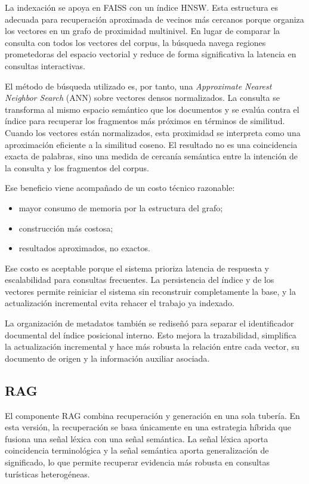 \documentclass{llncs}
\begin{document}
La indexación se apoya en FAISS con un índice HNSW. Esta estructura es adecuada para recuperación aproximada de vecinos más cercanos porque organiza los vectores en un grafo de proximidad multinivel. En lugar de comparar la consulta con todos los vectores del corpus, la búsqueda navega regiones prometedoras del espacio vectorial y reduce de forma significativa la latencia en consultas interactivas.

El método de búsqueda utilizado es, por tanto, una \textit{Approximate Nearest Neighbor Search} (ANN) sobre vectores densos normalizados. La consulta se transforma al mismo espacio semántico que los documentos y se evalúa contra el índice para recuperar los fragmentos más próximos en términos de similitud. Cuando los vectores están normalizados, esta proximidad se interpreta como una aproximación eficiente a la similitud coseno. El resultado no es una coincidencia exacta de palabras, sino una medida de cercanía semántica entre la intención de la consulta y los fragmentos del corpus.

Ese beneficio viene acompañado de un costo técnico razonable:

\begin{itemize}
    \item mayor consumo de memoria por la estructura del grafo;
    \item construcción más costosa;
    \item resultados aproximados, no exactos.
\end{itemize}

Ese costo es aceptable porque el sistema prioriza latencia de respuesta y escalabilidad para consultas frecuentes. La persistencia del índice y de los vectores permite reiniciar el sistema sin reconstruir completamente la base, y la actualización incremental evita rehacer el trabajo ya indexado.

La organización de metadatos también se rediseñó para separar el identificador documental del índice posicional interno. Esto mejora la trazabilidad, simplifica la actualización incremental y hace más robusta la relación entre cada vector, su documento de origen y la información auxiliar asociada.

\subsection{RAG}

El componente RAG combina recuperación y generación en una sola tubería. En esta versión, la recuperación se basa únicamente en una estrategia híbrida que fusiona una señal léxica con una señal semántica. La señal léxica aporta coincidencia terminológica y la señal semántica aporta generalización de significado, lo que permite recuperar evidencia más robusta en consultas turísticas heterogéneas.
\end{document}
